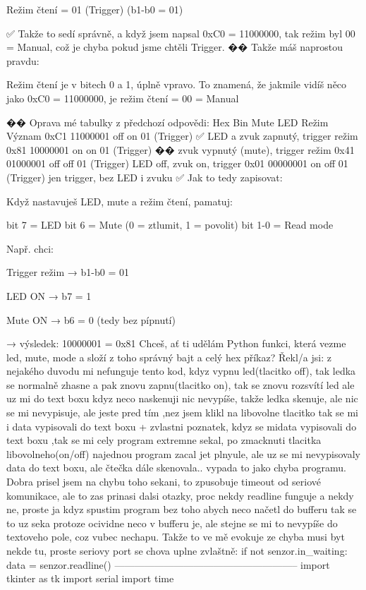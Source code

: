     Režim čtení = 01 (Trigger) (b1-b0 = 01)

✅ Takže to sedí správně, a když jsem napsal 0xC0 = 11000000, tak režim byl 00 = Manual, což je chyba pokud jsme chtěli Trigger.
�� Takže máš naprostou pravdu:

    Režim čtení je v bitech 0 a 1, úplně vpravo.
    To znamená, že jakmile vidíš něco jako 0xC0 = 11000000, je režim čtení = 00 = Manual

�� Oprava mé tabulky z předchozí odpovědi:
Hex	Bin	Mute	LED	Režim	Význam
0xC1	11000001	off	on	01 (Trigger)	✅ LED a zvuk zapnutý, trigger režim
0x81	10000001	on	on	01 (Trigger)	�� zvuk vypnutý (mute), trigger režim
0x41	01000001	off	off	01 (Trigger)	LED off, zvuk on, trigger
0x01	00000001	on	off	01 (Trigger)	jen trigger, bez LED i zvuku
✅ Jak to tedy zapisovat:

Když nastavuješ LED, mute a režim čtení, pamatuj:

bit 7 = LED
bit 6 = Mute (0 = ztlumit, 1 = povolit)
bit 1-0 = Read mode

Např. chci:

    Trigger režim → b1-b0 = 01

    LED ON → b7 = 1

    Mute ON → b6 = 0 (tedy bez pípnutí)

→ výsledek: 10000001 = 0x81
Chceš, ať ti udělám Python funkci, která vezme led, mute, mode a složí z toho správný bajt a celý hex příkaz?
Řekl/a jsi:
z nejakého duvodu mi nefunguje tento kod, kdyz vypnu led(tlacitko off), tak ledka se normalně zhasne a pak znovu zapnu(tlacitko on), tak se znovu rozsvítí led ale uz mi do text boxu kdyz neco naskenuji nic nevypíše, takže ledka skenuje, ale nic se mi nevypisuje, ale jeste pred tím ,nez jsem klikl na libovolne tlacitko tak se mi i data vypisovali do text boxu + zvlastni poznatek, kdyz se midata vypisovali do text boxu ,tak se mi cely program extremne sekal, po zmacknuti tlacitka libovolneho(on/off) najednou program zacal jet plnyule, ale uz se mi nevypisovaly data do text boxu, ale čtečka dále skenovala.. vypada to jako chyba programu. Dobra prisel jsem na chybu toho sekani, to zpusobuje timeout od seriové komunikace, ale to zas prinasi dalsi otazky, proc nekdy readline funguje a nekdy ne, proste ja kdyz spustim program bez toho abych neco načetl do bufferu tak se to uz seka protoze ocividne neco v bufferu je, ale stejne se mi to nevypíše do textoveho pole, coz vubec nechapu. Takže to ve mě evokuje ze chyba musi byt nekde tu, proste seriovy port se chova uplne zvlaštně:
if not senzor.in_waiting:
        data = senzor.readline()
--------------------------------------------------------
import tkinter as tk
import serial
import time

